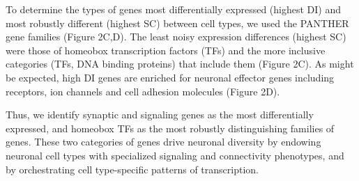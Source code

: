 To determine the types of genes most differentially expressed (highest DI) and most robustly different (highest SC) between cell types, we used the PANTHER gene families (Figure 2C,D). The least noisy expression differences (highest SC) were those of homeobox transcription factors (TFs) and the more inclusive categories (TFs, DNA binding proteins) that include them (Figure 2C). As might be expected, high DI genes are enriched for neuronal effector genes including receptors, ion channels and cell adhesion molecules (Figure 2D). 

Thus, we identify synaptic and signaling genes as the most differentially expressed, and homeobox TFs as the most robustly distinguishing families of genes. These two categories of genes drive neuronal diversity by endowing neuronal cell types with specialized signaling and connectivity phenotypes, and by orchestrating cell type-specific patterns of transcription. 


